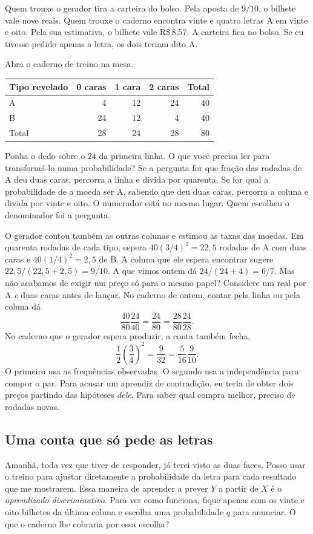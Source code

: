 \documentclass[12pt,oneside]{article}
\newcommand{\secao}[1]{\Needspace{5.2\baselineskip}\subsection*{#1}}
\newcommand{\bookanchor}[1]{\phantomsection\label{#1}}
\begin{document}
Quem trouxe o gerador tira a carteira do bolso. Pela aposta de $9/10$, o bilhete vale nove reais. Quem trouxe o caderno encontra vinte e quatro letras A em vinte e oito. Pela sua estimativa, o bilhete vale R\$\,8,57. A carteira fica no bolso. Se eu tivesse pedido apenas a letra, os dois teriam dito A.

Abra o caderno de treino na mesa.
\begin{center}
\begin{tabular}{lrrrr}
\toprule
Tipo revelado & 0 caras & 1 cara & 2 caras & Total\\
\midrule
A & 4 & 12 & 24 & 40\\
B & 24 & 12 & 4 & 40\\
\midrule
Total & 28 & 24 & 28 & 80\\
\bottomrule
\end{tabular}
\end{center}

Ponha o dedo sobre o $24$ da primeira linha. O que você precisa ler para transformá-lo numa probabilidade? Se a pergunta for que fração das rodadas de A deu duas caras, percorra a linha e divida por quarenta. Se for qual a probabilidade de a moeda ser A, sabendo que deu duas caras, percorra a coluna e divida por vinte e oito. O numerador está no mesmo lugar. Quem escolheu o denominador foi a pergunta.

O gerador contou também as outras colunas e estimou as taxas das moedas. Em quarenta rodadas de cada tipo, espera $40(3/4)^2=22{,}5$ rodadas de A com duas caras e $40(1/4)^2=2{,}5$ de B. A coluna que ele espera encontrar sugere $22{,}5/(22{,}5+2{,}5)=9/10$. A que vimos ontem dá $24/(24+4)=6/7$. Mas não acabamos de exigir um preço só para o mesmo papel? Considere um real por A \emph{e} duas caras antes de lançar. No caderno de ontem, contar pela linha ou pela coluna dá
\[
        \frac{40}{80}\frac{24}{40}
        =\frac{24}{80}
        =\frac{28}{80}\frac{24}{28}.
\]
No caderno que o gerador espera produzir, a conta também fecha,
\[
        \frac12\left(\frac34\right)^2
        =\frac{9}{32}
        =\frac{5}{16}\frac9{10}.
\]
O primeiro usa as frequências observadas. O segundo usa a independência para compor o par. Para acusar um aprendiz de contradição, eu teria de obter dois preços partindo das hipóteses \emph{dele}. Para saber qual compra melhor, preciso de rodadas novas.

\secao{Uma conta que só pede as letras}
Amanhã,\bookanchor{topic-04-1} toda vez que tiver de responder, já terei visto as duas faces. Posso usar o treino para ajustar diretamente a probabilidade da letra para cada resultado que me mostrarem. Essa maneira de aprender a prever $Y$ a partir de $X$ é o \emph{aprendizado discriminativo}. Para ver como funciona, fique apenas com os vinte e oito bilhetes da última coluna e escolha uma probabilidade $q$ para anunciar. O que o caderno lhe cobraria por essa escolha?
\end{document}
